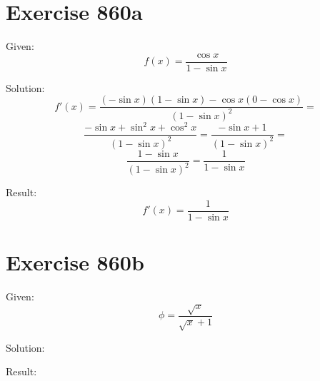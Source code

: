 \documentclass[a4paper, 10pt]{scrartcl}
\begin{document}
\section{Exercise 860a}

Given:
\[
f(x) = \frac{\cos{x}}{1 - \sin{x}}
\]

Solution:
\[
f'(x) = \frac{(-\sin{x})(1 - \sin{x}) - \cos{x}(0 - \cos{x})}{(1 - \sin{x})^{2}} =
\]
\[
\frac{-\sin{x} + \sin^{2}{x} + \cos^{2}{x}}{(1 - \sin{x})^{2}} = \frac{-\sin{x} + 1}{(1 - \sin{x})^{2}} =
\]
\[
\frac{1 - \sin{x}}{(1 - \sin{x})^{2}} = \frac{1}{1 - \sin{x}}
\]

Result:
\[
f'(x) = \frac{1}{1 - \sin{x}}
\]

\section{Exercise 860b}

Given:
\[
\phi = \frac{\sqrt{x}}{\sqrt{x} + 1}
\]

Solution:

Result:
\end{document}
